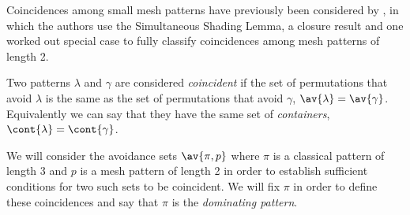 Coincidences among small mesh patterns have previously been considered by 
\textcite{DBLP:journals/corr/ClaessonTU14}, in which the authors use the Simultaneous Shading Lemma,
a closure result and one worked out special case to fully classify coincidences among mesh patterns
of length 2.

Two patterns \(\lambda\) and \(\gamma\) are considered \emph{coincident} if the set of permutations
that avoid \(\lambda\) is the same as the set of permutations that avoid \(\gamma\), \ie \(\av{\lambda} = \av{\gamma}\).
Equivalently we can say that they have the same set of \emph{containers},\ie \(\cont{\lambda} = \cont{\gamma}\).

We will consider the avoidance sets \(\av{\pi,p}\) where \(\pi\) is a classical pattern of length 3
and \(p\) is a mesh pattern of length 2 in order to establish sufficient conditions for two such
sets to be coincident. We will fix \(\pi\) in order to define these coincidences and say that \(\pi\)
is the \emph{dominating pattern}.

